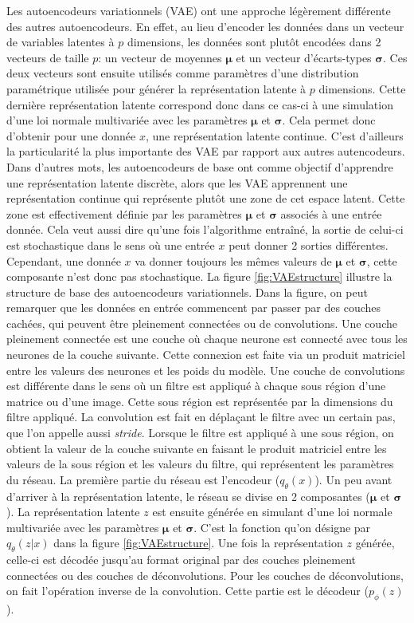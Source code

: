 Les autoencodeurs variationnels (VAE)  \cite{kingma2013autoencoding} ont une approche légèrement différente des autres autoencodeurs. En effet, au lieu d'encoder les données dans un vecteur de variables latentes à $p$ dimensions, les données sont plutôt encodées dans 2 vecteurs de taille $p$: un vecteur de moyennes $\boldsymbol \mu$ et un vecteur d'écarts-types $\boldsymbol \sigma$. Ces deux vecteurs sont ensuite utilisés comme paramètres d'une distribution paramétrique utilisée pour générer la représentation latente à $p$ dimensions. Cette dernière représentation latente correspond donc dans ce cas-ci à une simulation d'une loi normale multivariée avec les paramètres $\boldsymbol \mu$ et $\boldsymbol \sigma$. Cela permet donc d'obtenir pour une donnée $x$, une représentation latente continue. C'est d'ailleurs la particularité la plus importante des VAE par rapport aux autres autencodeurs. Dans d'autres mots, les autoencodeurs de base ont comme objectif d'apprendre une représentation latente discrète, alors que les VAE apprennent une représentation continue qui représente plutôt une zone de cet espace latent. Cette zone est effectivement définie par les paramètres $\boldsymbol \mu$ et $\boldsymbol \sigma$ associés à une entrée donnée. Cela veut aussi dire qu'une fois l'algorithme entraîné, la sortie de celui-ci est stochastique dans le sens où une entrée $x$ peut donner 2 sorties différentes. Cependant, une donnée $x$ va donner toujours les mêmes valeurs de $\boldsymbol \mu$ et $\boldsymbol \sigma$, cette composante n'est donc pas stochastique. La figure \ref{fig:VAEstructure} illustre la structure de base des autoencodeurs variationnels. Dans la figure, on peut remarquer que les données en entrée commencent par passer par des couches cachées, qui peuvent être pleinement connectées ou de convolutions. Une couche pleinement connectée est une couche où chaque neurone est connecté avec tous les neurones de la couche suivante. Cette connexion est faite via un produit matriciel entre les valeurs des neurones et les poids du modèle. Une couche de convolutions est différente dans le sens où un filtre est appliqué à chaque sous région d'une matrice ou d'une image. Cette sous région est représentée par la dimensions du filtre appliqué. La convolution est fait en déplaçant le filtre avec un certain pas, que l'on appelle aussi \textit{stride}. Lorsque le filtre est appliqué à une sous région, on obtient la valeur de la couche suivante en faisant le produit matriciel entre les valeurs de la sous région et les valeurs du filtre, qui représentent les paramètres du réseau. La première partie du réseau est l'encodeur ($q_{\theta}(x)$). Un peu avant d'arriver à la représentation latente, le réseau se divise en 2 composantes ($\boldsymbol \mu$ et $\boldsymbol \sigma$). La représentation latente $z$ est ensuite générée en simulant d'une loi normale multivariée avec les paramètres $\boldsymbol \mu$ et $\boldsymbol \sigma$. C'est la fonction qu'on désigne par $q_{\theta}(z|x)$ dans la figure \ref{fig:VAEstructure}. Une fois la représentation $z$ générée, celle-ci est décodée jusqu'au format original par des couches pleinement connectées ou des couches de déconvolutions. Pour les couches de déconvolutions, on fait l'opération inverse de la convolution. Cette partie est le décodeur ($p_{\phi}(z)$).

